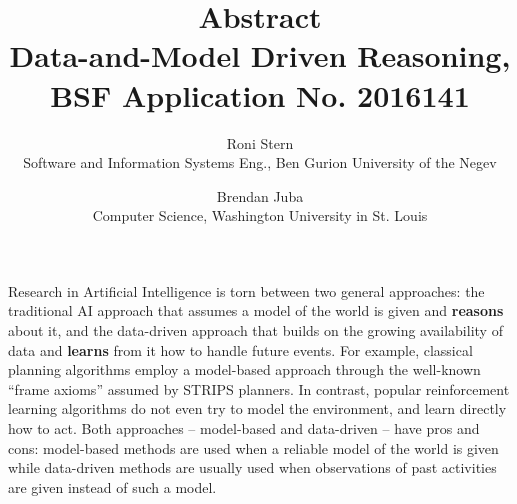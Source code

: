\documentclass[12pt]{article}
\begin{document}
\title{Abstract \\ \Large{Data-and-Model Driven Reasoning, BSF Application No. 2016141}}
\date{\vspace{-0.5cm}}
\author{Roni Stern \\ Software and Information Systems Eng., Ben Gurion University of the Negev
        \and Brendan Juba \\ Computer Science, Washington University in St. Louis}
\maketitle









Research in Artificial Intelligence is torn between two general approaches: the traditional AI approach that assumes a model of the world is given and {\bf reasons} about it, and the data-driven  approach that builds on the growing availability of data and {\bf learns} from it how to handle future events. For example, classical planning algorithms employ a model-based approach through the well-known ``frame axioms'' assumed by STRIPS planners. In contrast, popular reinforcement learning algorithms do not even try to model the environment, and learn directly how to act. Both approaches -- model-based and data-driven -- have pros and cons: model-based methods are used when a reliable model of the world is given while data-driven methods are usually used when observations of past activities are given instead of such a model. 
\end{document}
